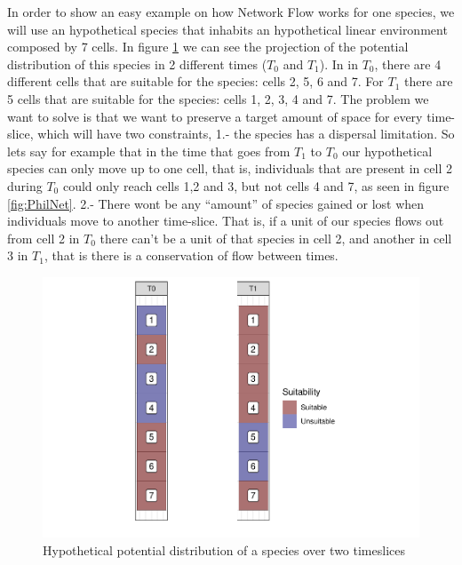 \documentclass[]{article}
\begin{document}
In order to show an easy example on how Network Flow works for one species, we will use an hypothetical species that inhabits an hypothetical linear environment composed by 7 cells. In figure \ref{fig:Phil} we can see the projection of the potential distribution of this species in 2 different times (\(T_0\) and \(T_1\)). In in \(T_0\), there are 4 different cells that are suitable for the species: cells 2, 5, 6 and 7. For \(T_1\) there are 5 cells that are suitable for the species: cells 1, 2, 3, 4 and 7. The problem we want to solve is that we want to preserve a target amount of space for every time-slice, which will have two constraints, 1.- the species has a dispersal limitation. So lets say for example that in the time that goes from \(T_1\) to \(T_0\) our hypothetical species can only move up to one cell, that is, individuals that are present in cell 2 during \(T_0\) could only reach cells 1,2 and 3, but not cells 4 and 7, as seen in figure \ref{fig:PhilNet}. 2.- There wont be any ``amount'' of species gained or lost when individuals move to another time-slice. That is, if a unit of our species flows out from cell 2 in \(T_0\) there can't be a unit of that species in cell 2, and another in cell 3 in \(T_1\), that is there is a conservation of flow between times.

\begin{figure}
\centering
\includegraphics{TagetBasedNew_files/figure-latex/Phil-1.pdf}
\caption{\label{fig:Phil}Hypothetical potential distribution of a species over two timeslices}
\end{figure}
\end{document}
